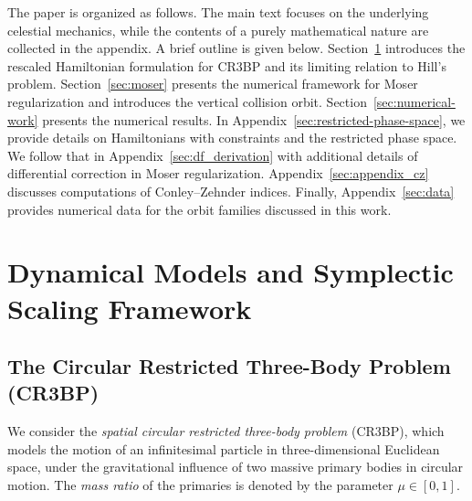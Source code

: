 \documentclass[pdflatex,sn-mathphys-ay]{sn-jnl}%
\theoremstyle{thmstyleone}%
\theoremstyle{thmstyletwo}%
\theoremstyle{thmstylethree}%
\begin{document}
The paper is organized as follows. 
The main text focuses on the underlying celestial mechanics, while the contents of a purely mathematical nature are collected in the appendix. A brief outline is given below.
Section~\ref{sec:models} introduces the rescaled Hamiltonian formulation for CR3BP and its limiting relation to Hill's problem.
Section~\ref{sec:moser} presents the numerical framework for Moser regularization and introduces the vertical collision orbit.
Section~\ref{sec:numerical-work} presents the numerical results.
In Appendix~\ref{sec:restricted-phase-space}, we provide details on Hamiltonians with constraints and the restricted phase space. We follow that in Appendix~\ref{sec:df_derivation} with additional details of differential correction in Moser regularization. Appendix~\ref{sec:appendix_cz} discusses computations of Conley--Zehnder indices. %
Finally, Appendix~\ref{sec:data} provides numerical data for the orbit families discussed in this work.

\section{Dynamical Models and Symplectic Scaling Framework}
\label{sec:models}
\subsection{The Circular Restricted Three-Body Problem (CR3BP)}
We consider the \emph{spatial circular restricted three-body problem} (CR3BP), which models the motion of an infinitesimal particle in three-dimensional Euclidean space, under the gravitational influence of two massive primary bodies in circular motion. The \emph{mass ratio} of the primaries is denoted by the parameter \(\mu \in [0, 1]\).
\end{document}
